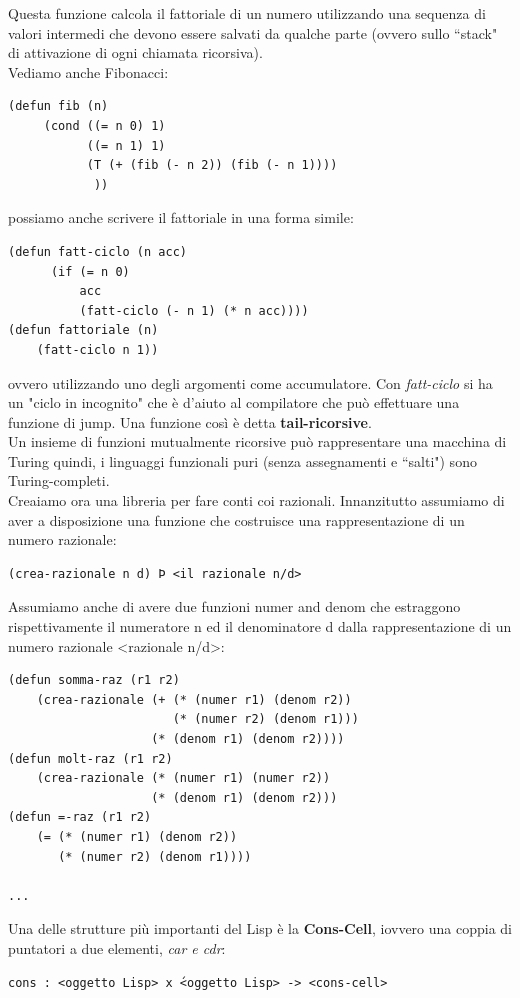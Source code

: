 \documentclass[a4paper,12pt, oneside]{book}
\begin{document}
Questa funzione calcola il fattoriale di un numero utilizzando
una sequenza di valori intermedi che devono essere salvati da
qualche parte (ovvero sullo “stack" di attivazione di ogni
chiamata ricorsiva). \\
Vediamo anche Fibonacci:
\begin{verbatim}
(defun fib (n)
     (cond ((= n 0) 1)
           ((= n 1) 1)
           (T (+ (fib (- n 2)) (fib (- n 1))))
            ))
\end{verbatim}
possiamo anche scrivere il fattoriale in una forma simile:
\begin{verbatim}
(defun fatt-ciclo (n acc)
      (if (= n 0)
          acc
          (fatt-ciclo (- n 1) (* n acc))))
(defun fattoriale (n)
    (fatt-ciclo n 1))
\end{verbatim}
ovvero utilizzando uno degli argomenti come accumulatore. Con \textit{fatt-ciclo} si ha un "ciclo in incognito" che è d'aiuto al compilatore che può effettuare una funzione di jump. Una funzione così è detta \textbf{tail-ricorsive}.\\
Un insieme di funzioni mutualmente ricorsive può rappresentare una
macchina di Turing quindi, i linguaggi funzionali puri (senza assegnamenti e “salti") sono Turing-completi.\\
Creaiamo ora una libreria per fare conti coi razionali. Innanzitutto assumiamo di aver a disposizione una funzione che
costruisce una rappresentazione di un numero razionale:
\begin{verbatim}
(crea-razionale n d) Þ <il razionale n/d>
\end{verbatim}
Assumiamo anche di avere due funzioni numer and denom che
estraggono rispettivamente il numeratore n ed il denominatore d dalla
rappresentazione di un numero razionale <razionale n/d>:
\begin{verbatim}
(defun somma-raz (r1 r2)
    (crea-razionale (+ (* (numer r1) (denom r2))
                       (* (numer r2) (denom r1)))
                    (* (denom r1) (denom r2))))
(defun molt-raz (r1 r2)
    (crea-razionale (* (numer r1) (numer r2))
                    (* (denom r1) (denom r2)))
(defun =-raz (r1 r2)
    (= (* (numer r1) (denom r2))
       (* (numer r2) (denom r1))))
       
...
\end{verbatim}
Una delle strutture più importanti del Lisp è la \textbf{Cons-Cell}, iovvero una coppia di puntatori a due elementi, \textit{car e cdr}:
\begin{verbatim}
cons : <oggetto Lisp> x ́<oggetto Lisp> -> <cons-cell>
\end{verbatim}
\end{document}
